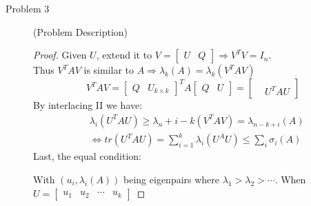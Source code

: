 \documentclass{article}
\begin{document}
\begin{description}
	\item[Problem 3] (Problem Description)
	\begin{proof}
		Given $U$, extend it to $V = \begin{bmatrix}U & Q\end{bmatrix} \Rightarrow V^TV = I_n$. \\
		Thus $V^TAV$ is similar to $A \Rightarrow \lambda_k(A) = \lambda_k(V^TAV)$
		\begin{equation}
			V^TAV = \begin{bmatrix}Q & U_{k\times k}\end{bmatrix}^TA\begin{bmatrix}Q & U\end{bmatrix} = \begin{bmatrix} & \\ & U^TAU\end{bmatrix}
		\end{equation}
		By interlacing II we have:
		\begin{equation}\begin{aligned}
			& \lambda_i (U^TAU) \geq \lambda_n+i-k(V^TAV) = \lambda_{n-k+i}(A) \\
			& \Leftrightarrow tr(U^TAU) = \sum_{i = 1}^k \lambda_i(U^AU) \leq \sum_{i}\sigma_{i}(A)
		\end{aligned}\end{equation}
		Last, the equal condition: 
		\par With $(u_i, \lambda_i(A))$ being eigenpairs where $\lambda_1 > \lambda_2 > \cdots$.
		When $U = \begin{bmatrix}u_1 & u_2 & \cdots & u_k\end{bmatrix}$


\end{proof}
\end{description}
\end{document}
